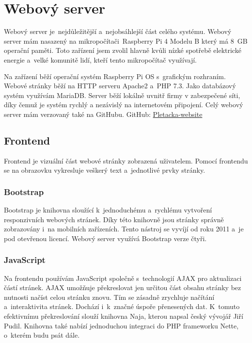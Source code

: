 \chapter{Webový server}
Webový server je~nejdůležitější a~nejobsáhlejší část celého systému. 
Webový server mám nasazený na mikropočítači~Raspberry Pi 4 Modelu B který má 8~GB operační paměti.
Toto zařízení jsem zvolil hlavně kvůli nízké spotřebě elektrické energie a~velké komunitě lidí, kteří tento mikropočítač využívají.

Na zařízení běží operační systém Raspberry Pi OS s~grafickým rozhraním.
Webové stránky běží na HTTP serveru Apache2 a~PHP 7.3.
Jako databázový systém využívám MariaDB.
Server běží lokálně uvnitř firmy v zabezpečené síti, díky čemuž je systém rychlý a nezávislý na internetovém připojení.
Celý webový server mám verzovaný také na GitHubu.\newline
GitHub: \href{https://github.com/Pletacka-IoT/Pletacka-website}{Pletacka-website}\cite{PL_WEB}

\section{Frontend}
 
Frontend je vizuální část webové stránky zobrazená uživatelem.
Pomocí frontendu se na obrazovku vykresluje veškerý text a~jednotlivé prvky stránky.

\subsection{Bootstrap}
Bootstrap je knihovna sloužící k~jednoduchému a~rychlému vytvoření responzivních webových stránek.
Díky této knihovně jsou stránky správně zobrazovány i~na mobilních zařízeních.
Tento nástroj se vyvíjí od roku 2011 a~je pod otevřenou licencí.
Webový server využívá Bootstrap verze čtyři.


\subsection{JavaScript}
Na frontendu používám JavaScript společně s~technologií AJAX pro aktualizaci částí stránek. AJAX umožňuje překreslovat jen určitou část obsahu stránky bez nutnosti načíst celou stránku znovu.
Tím se zásadně zrychluje načítání a~interaktivita stránek. Dochází i~k~značné úspoře přenesených dat.
K~tomuto efektivnímu překreslování slouží knihovna Naja\cite{NAJA}, kterou napsal český vývojář Jiří Pudil.
Knihovna také nabízí jednoduchou integraci do PHP frameworku Nette, o~kterém budu psát dále.   



